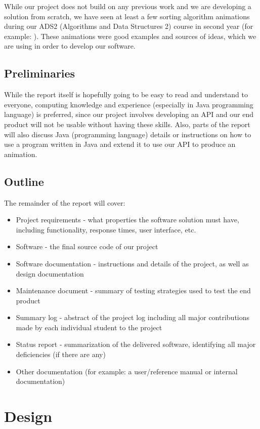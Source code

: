 \documentclass{l3proj}
\begin{document}
While our project does not build on any previous work and we are developing a solution from scratch, we have seen at least a few sorting algorithm animations during our ADS2 (Algorithms and Data Structures 2) course in second year (for example: \cite{website:Examples}). These animations were good examples and sources of ideas, which we are using in order to develop our software.

\section{Preliminaries}
While the report itself is hopefully going to be easy to read and understand to everyone, computing knowledge and experience (especially in Java programming language) is preferred, since our project involves developing an API and our end product will not be usable without having these skills. Also, parts of the report will also discuss Java (programming language) details or instructions on how to use a program written in Java and extend it to use our API to produce an animation.

\section{Outline}
The remainder of the report will cover:
\begin{itemize}
	\item Project requirements - what properties the software solution must have, including functionality,
	response times, user interface, etc.
	\item Software - the final source code of our project
	\item Software documentation - instructions and details of the project, as well as design documentation
	\item Maintenance document - summary of testing strategies used to test the end product
	\item Summary log - abstract of the project log including all major contributions made by each individual
	student to the project
	\item Status report - summarization of the delivered software, identifying all major deficiencies (if
	there are any)
	\item Other documentation (for example: a user/reference manual or internal documentation)
\end{itemize}

\chapter{Design}
\label{design}
\end{document}
